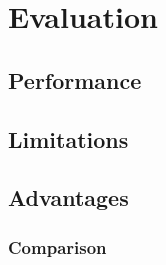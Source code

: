 \chapter{Evaluation}
\section{Performance}
\section{Limitations}
\section{Advantages}
\subsection{Comparison}
